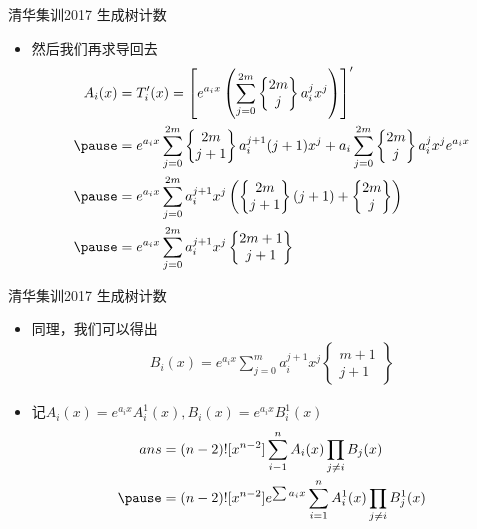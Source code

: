 \documentclass{beamer}
\begin{document}
\begin{frame}{清华集训2017 生成树计数}
    \begin{itemize}
        \item 然后我们再求导回去 \pause
        $$\begin{aligned}
            A_i(x) &= T_i'(x) = \left[e^{a_ix}\left(\sum_{j = 0}^{2m} \begin{Bmatrix}2m\\ j\end{Bmatrix} a_i^j x^j \right) \right]'\\ \pause
            &= e^{a_ix}\sum_{j = 0}^{2m} \begin{Bmatrix}2m\\ j + 1\end{Bmatrix} a_i^{j + 1} (j + 1) x^j + a_i \sum_{j = 0}^{2m} \begin{Bmatrix}2m\\ j\end{Bmatrix} a_i^j x^j e^{a_ix}\\ \pause
            &= e^{a_ix}\sum_{j = 0}^{2m} a_i^{j + 1}x^j \left(\begin{Bmatrix}2m\\ j + 1\end{Bmatrix}(j + 1) + \begin{Bmatrix}2m\\ j\end{Bmatrix}\right)\\ \pause
            &= e^{a_ix}\sum_{j = 0}^{2m} a_i^{j + 1}x^j \begin{Bmatrix}2m + 1\\ j + 1\end{Bmatrix}
        \end{aligned}$$
    \end{itemize}
\end{frame}

\begin{frame}{清华集训2017 生成树计数}
    \begin{itemize}
        \item 同理，我们可以得出
        $$\begin{aligned}
            B_i(x) = e^{a_ix}\sum_{j = 0}^{m} a_i^{j + 1}x^j \begin{Bmatrix}m + 1\\ j + 1\end{Bmatrix}
        \end{aligned}$$ \pause
        \item 记$A_i(x) = e^{a_ix}A^1_i(x), B_i(x) = e^{a_ix}B^1_i(x)$ \pause
        $$\begin{aligned}
            ans &= (n - 2)![x^{n - 2}]\sum_{i - 1}^n A_i(x)\prod_{j\neq i}B_j(x)\\ \pause
            &= (n - 2)![x^{n - 2}]e^{\sum a_ix} \sum_{i = 1}^n A^1_i(x) \prod_{j\neq i} B^1_j(x)
        \end{aligned}$$
    \end{itemize}
\end{frame}
\end{document}
